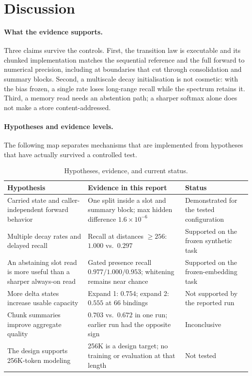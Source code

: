 \section{Discussion}
\label{sec:discussion}

\paragraph{What the evidence supports.}
Three claims survive the controls. First, the transition law is executable and its chunked
implementation matches the sequential reference and the full forward to numerical precision,
including at boundaries that cut through consolidation and summary blocks. Second, a
multiscale decay initialisation is not cosmetic: with the bias frozen, a single rate loses
long-range recall while the spectrum retains it. Third, a memory read needs an abstention path;
a sharper softmax alone does not make a store content-addressed.

\paragraph{Hypotheses and evidence levels.}
The following map separates mechanisms that are implemented from hypotheses that have actually
survived a controlled test.
\begin{table}[t]
\centering
\caption{Hypotheses, evidence, and current status.}
\label{tab:hypotheses}
\small
\begin{tabularx}{\textwidth}{@{}
>{\raggedright\arraybackslash}p{}
>{\raggedright\arraybackslash}p{}
>{\raggedright\arraybackslash}p{}@{}}
\toprule
Hypothesis & Evidence in this report & Status \\
\midrule
Carried state and caller-independent forward behavior &
One split inside a slot and summary block; max hidden difference $1.6\times10^{-6}$ &
Demonstrated for the tested configuration \\
Multiple decay rates and delayed recall &
Recall at distances $\geq256$: $1.000$ vs.\ $0.297$ &
Supported on the frozen synthetic task \\
An abstaining slot read is more useful than a sharper always-on read &
Gated presence recall $0.977/1.000/0.953$; whitening remains near chance &
Supported on the frozen-embedding task \\
More delta states increase usable capacity &
Expand 1: $0.754$; expand 2: $0.555$ at 66 bindings &
Not supported by the reported run \\
Chunk summaries improve aggregate quality &
$0.703$ vs.\ $0.672$ in one run; earlier run had the opposite sign &
Inconclusive \\
The design supports 256K-token modeling &
256K is a design target; no training or evaluation at that length &
Not tested \\
\bottomrule
\end{tabularx}
\end{table}


